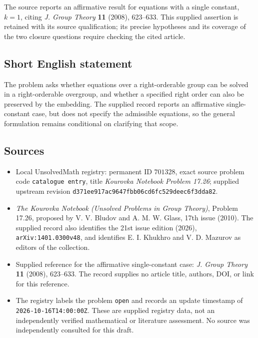 \documentclass[11pt]{article}
\begin{document}
The source reports an affirmative result for equations with a single constant, \(k=1\), citing \emph{J. Group Theory} \textbf{11} (2008), 623--633. This supplied assertion is retained with its source qualification; its precise hypotheses and its coverage of the two closure questions require checking the cited article.
\subsection{Short English statement}
The problem asks whether equations over a right-orderable group can be solved in a right-orderable overgroup, and whether a specified right order can also be preserved by the embedding. The supplied record reports an affirmative single-constant case, but does not specify the admissible equations, so the general formulation remains conditional on clarifying that scope.
\subsection{Sources}
\begin{itemize}
\item Local UnsolvedMath registry: permanent ID \(701328\), exact source problem code \texttt{catalogue entry}, title \emph{Kourovka Notebook Problem 17.26}; supplied upstream revision \texttt{d371ee917ac9647fbb06cd6fc529deec6f3dda82}.
\item \emph{The Kourovka Notebook (Unsolved Problems in Group Theory)}, Problem 17.26, proposed by V. V. Bludov and A. M. W. Glass, 17th issue (2010). The supplied record also identifies the 21st issue edition (2026), \texttt{arXiv:1401.0300v48}, and identifies E. I. Khukhro and V. D. Mazurov as editors of the collection.
\item Supplied reference for the affirmative single-constant case: \emph{J. Group Theory} \textbf{11} (2008), 623--633. The record supplies no article title, authors, DOI, or link for this reference.
\item The registry labels the problem \texttt{open} and records an update timestamp of \texttt{2026-10-16T14:00:00Z}. These are supplied registry data, not an independently verified mathematical or literature assessment. No source was independently consulted for this draft.
\end{itemize}
\end{document}
